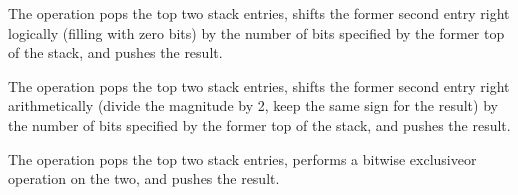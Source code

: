 \begin{enumerate}[1. ]
\itembfnl{\DWOPshrTARG}
The \DWOPshrTARG{} operation pops the top two stack entries,
shifts the former second entry right logically (filling with
zero bits) by the number of bits specified by the former top
of the stack, and pushes the result.

\itembfnl{\DWOPshraTARG}
The \DWOPshraTARG{} operation pops the top two stack entries,
shifts the former second entry right arithmetically (divide
the magnitude by 2, keep the same sign for the result) by
the number of bits specified by the former top of the stack,
and pushes the result.

\itembfnl{\DWOPxorTARG}
The \DWOPxorTARG{} operation pops the top two stack entries,
performs a bitwise exclusive\dash or operation on the two, and
pushes the result.

\end{enumerate}


